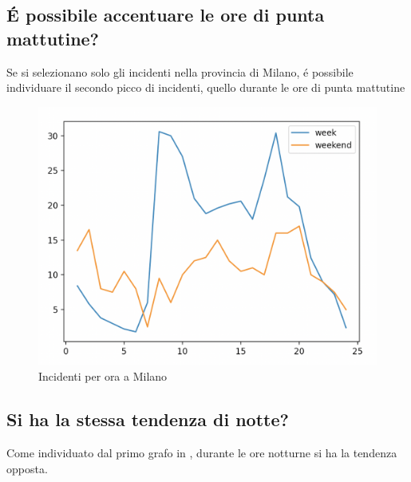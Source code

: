 \documentclass[a4paper]{report}
\begin{document}
\newpage
\subsection{\'E possibile accentuare le ore di punta mattutine?}

Se si selezionano solo gli incidenti nella provincia di Milano, \'e possibile individuare 
il secondo picco di incidenti, quello durante le ore di punta mattutine

\begin{figure}[!ht]
    \includegraphics[width=\linewidth]{../src/incidenti/incidenti_senza_coords/ore_punta/week_weekend_milano.png}
    \caption{Incidenti per ora a Milano}
    \label{fig:week_weekend_milano}
\end{figure}


\newpage
\subsection{Si ha la stessa tendenza di notte?}

Come individuato dal primo grafo in \label{fig:week_weekend}, durante le 
ore notturne si ha la tendenza opposta.
\end{document}
